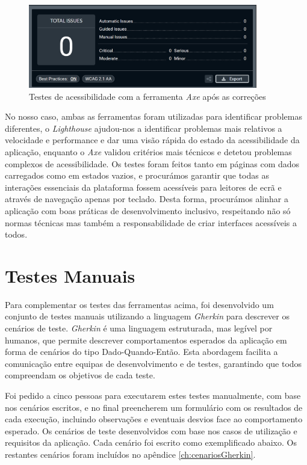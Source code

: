 \begin{figure}[H]
\centering
\includegraphics[max width=10cm]{./img/axe_after}
\caption{Testes de acessibilidade com a ferramenta \textit{Axe} após as correções}
\end{figure}

No nosso caso, ambas as ferramentas foram utilizadas para identificar problemas diferentes, o \textit{Lighthouse} ajudou-nos a identificar problemas mais relativos a velocidade e performance e dar uma visão rápida do estado da acessibilidade da aplicação, enquanto o \textit{Axe} validou critérios mais técnicos e detetou problemas complexos de acessibilidade. Os testes foram feitos tanto em páginas com dados carregados como em estados vazios, e procurámos garantir que todas as interações essenciais da plataforma fossem acessíveis para leitores de ecrã e através de navegação apenas por teclado. Desta forma, procurámos alinhar a aplicação com boas práticas de desenvolvimento inclusivo, respeitando não só normas técnicas mas também a responsabilidade de criar interfaces acessíveis a todos.

\section{Testes Manuais}

Para complementar os testes das ferramentas acima, foi desenvolvido um conjunto de testes manuais utilizando a linguagem \textit{Gherkin} para descrever os cenários de teste. \textit{Gherkin} é uma linguagem estruturada, mas legível por humanos, que permite descrever comportamentos esperados da aplicação em forma de cenários do tipo Dado-Quando-Então. Esta abordagem facilita a comunicação entre equipas de desenvolvimento e de testes, garantindo que todos compreendam os objetivos de cada teste.

Foi pedido a cinco pessoas para executarem estes testes manualmente, com base nos cenários escritos, e no final preencherem um formulário com os resultados de cada execução, incluindo observações e eventuais desvios face ao comportamento esperado. Os cenários de teste desenvolvidos com base nos casos de utilização e requisitos da aplicação. Cada cenário foi escrito como exemplificado abaixo. Os restantes cenários foram incluídos no apêndice \ref{ch:cenariosGherkin}.

